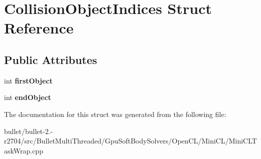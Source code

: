 \hypertarget{struct_collision_object_indices}{\section{Collision\+Object\+Indices Struct Reference}
\label{struct_collision_object_indices}
}
\subsection*{Public Attributes}
\begin{DoxyCompactItemize}
\item 
\hypertarget{struct_collision_object_indices_a2e413dc0e33607ad6c582d5e9ec54e95}{int {\bfseries first\+Object}}\label{struct_collision_object_indices_a2e413dc0e33607ad6c582d5e9ec54e95}

\item 
\hypertarget{struct_collision_object_indices_aa08eec8cd3f72e7013bad29c75b6cc28}{int {\bfseries end\+Object}}\label{struct_collision_object_indices_aa08eec8cd3f72e7013bad29c75b6cc28}

\end{DoxyCompactItemize}


The documentation for this struct was generated from the following file\+:\begin{DoxyCompactItemize}
\item 
bullet/bullet-\/2.-\/r2704/src/\+Bullet\+Multi\+Threaded/\+Gpu\+Soft\+Body\+Solvers/\+Open\+C\+L/\+Mini\+C\+L/Mini\+C\+L\+Task\+Wrap.\+cpp\end{DoxyCompactItemize}

